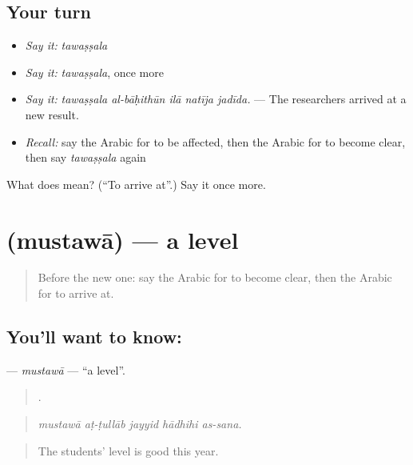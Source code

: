 \subsection*{Your turn}
\begin{itemize}
\raggedright
  \item \emph{Say it:} \emph{tawaṣṣala}
  \item \emph{Say it:} \emph{tawaṣṣala}, once more
  \item \emph{Say it:} \emph{tawaṣṣala al-bāḥithūn ilā natīja jadīda.} — The researchers arrived at a new result.
  \item \emph{Recall:} say the Arabic for to be affected, then the Arabic for to become clear, then say \emph{tawaṣṣala} again
\end{itemize}

\begin{tcolorbox}[breakable,colback=teal!4,colframe=teal!35!black,title={Before you move on}]
What does  mean? (\textquotedblleft{}To arrive at\textquotedblright{}.) Say it once more.
\end{tcolorbox}
\section[\texorpdfstring{\ar{مستوى} (mustawā)}{مستوى (mustawā)}]{ (mustawā) — a level}

\label{lesson:AR-C415-mustawa}



\begin{quote}
Before the new one: say the Arabic for to become clear, then the Arabic for to arrive at.
\end{quote}

\subsection*{You'll want to know: }
\textbf{} — \emph{mustawā} — \textquotedblleft{}a level\textquotedblright{}.

\begin{quote}
    .
\end{quote}

\begin{quote}
\emph{mustawā aṭ-ṭullāb jayyid hādhihi as-sana.}
\end{quote}

\begin{quote}
The students' level is good this year.
\end{quote}

